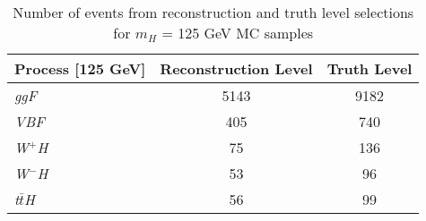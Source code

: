 \documentclass[a4paper, oneside, 11pt, openright]{book}
\begin{document}
 			\begin{table}[tbp]
 				\centering
 				\begin{tabular}{lcc}
 					\toprule[1.5pt]
 					Process	[125 GeV]		& Reconstruction Level	& Truth Level	\\
 					\midrule
 					\textit{ggF}			& 5143					& 9182		\\
 					\textit{VBF}			& 405	 				& 740			\\
					\textit{W$^+$H}			& 75	 				& 136			\\
 					\textit{W$^-$H}			& 53 					& 96			\\
 					\textit{t$\bar{t}$H}	& 56	 				& 99			\\
 					\bottomrule[1.5pt]	
 				\end{tabular}
 				\caption{Number of events from reconstruction and truth level selections for $m_H$ = 125 GeV MC samples}
 				\label{tab:sel_events}
 			\end{table}	
 			
\end{document}
